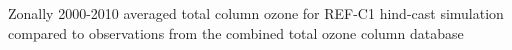 \label{toc}
Zonally 2000-2010 averaged total column ozone for REF-C1 hind-cast simulation compared to observations from the combined total ozone column database